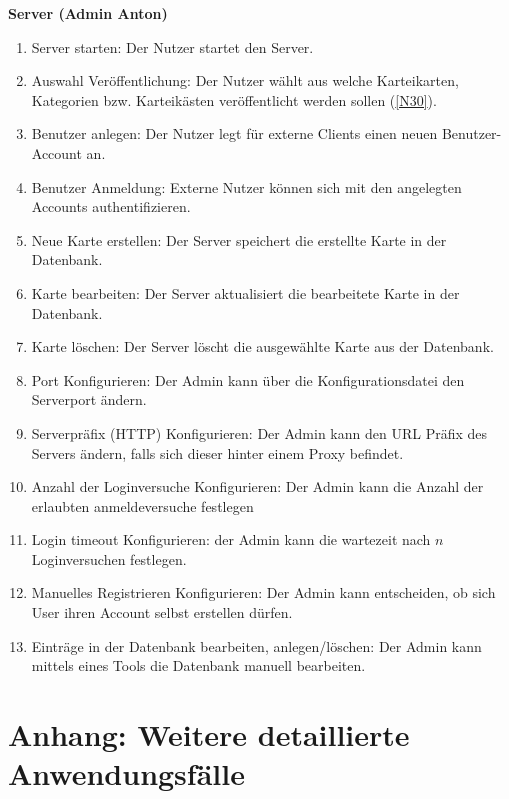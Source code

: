 \documentclass[fontsize=12pt,paper=a4,twoside]{scrartcl}
\begin{document}
\textbf{Server (Admin Anton)}
\begin{enumerate}[label={A\arabic*}]
	\item Server starten: Der Nutzer startet den Server.
	\item Auswahl Veröffentlichung: Der Nutzer wählt aus welche Karteikarten, Kategorien bzw. Karteikästen veröffentlicht werden sollen (\ref{N30}).
	\item Benutzer anlegen: Der Nutzer legt für externe Clients einen neuen Benutzer-Account an.
	\item Benutzer Anmeldung: Externe Nutzer können sich mit den angelegten Accounts authentifizieren.
	\item Neue Karte erstellen: Der Server speichert die erstellte Karte in der Datenbank.
	\item Karte bearbeiten: Der Server aktualisiert die bearbeitete Karte in der Datenbank.
	\item Karte löschen: Der Server löscht die ausgewählte Karte aus der Datenbank.

	\item Port Konfigurieren: Der Admin kann über die Konfigurationsdatei den Serverport ändern.
	\item Serverpräfix (HTTP) Konfigurieren: Der Admin kann den URL Präfix des Servers ändern, falls sich dieser hinter einem Proxy befindet.
	\item Anzahl der Loginversuche Konfigurieren: Der Admin kann die Anzahl der erlaubten anmeldeversuche festlegen
	\item Login timeout Konfigurieren: der Admin kann die wartezeit nach $n$ Loginversuchen festlegen.
	\item Manuelles Registrieren Konfigurieren: Der Admin kann entscheiden, ob sich User ihren Account selbst erstellen dürfen.
	\item Einträge in der Datenbank bearbeiten, anlegen/löschen: Der Admin kann mittels eines Tools die Datenbank manuell bearbeiten.
\end{enumerate}


\clearpage
\section{Anhang: Weitere detaillierte Anwendungsfälle}
\end{document}
